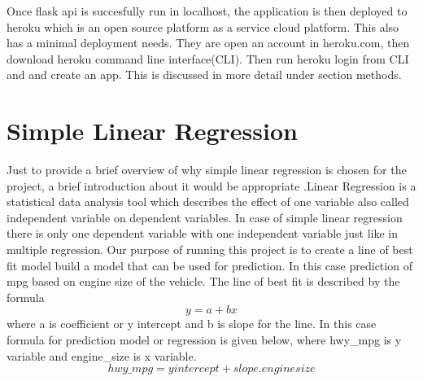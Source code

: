   Once flask api is succesfully run in localhost, the application is
  then deployed to heroku which is an open source platform as a 
  service cloud platform. This also has a minimal deployment needs.
  They are open an account in heroku.com, then download heroku
  command line interface(CLI). Then run heroku login from CLI and
  and create an app. This is discussed in more detail under section
  methods.
  
 
 
\section{Simple Linear Regression}
  Just to provide a brief overview of why simple linear regression is
  chosen for the project, a brief introduction about it would be
  appropriate .Linear Regression is a statistical data analysis tool
  which describes the effect of one variable also called independent
  variable on dependent variables. In case of simple linear regression
  there is only one dependent variable with one independent variable
  just like in multiple regression. Our purpose of running this project
  is to create a line of best fit model build a model that can be used
  for prediction. In this case prediction of mpg based on engine size
  of the vehicle. The line of best fit is described by the
  formula \[y = a + bx\] where a is coefficient or y intercept and b is
  slope for the line. In this case formula for prediction model or
  regression is given below, where hwy\_mpg is y variable and
  engine\_size is x variable.
  \[hwy\_mpg = yintercept + slope.enginesize\] 
